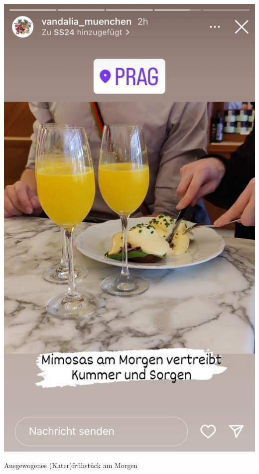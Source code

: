 \begin{center}
\begin{figurehere}
\includegraphics[width=.7\linewidth]{./Bilder/1.5BackToTheRootsAktivenfahrtPrag/4.bild.jpeg} 
  \caption{Ausgewogenes (Kater)frühstück am Morgen}
\end{figurehere}
\end{center}	

